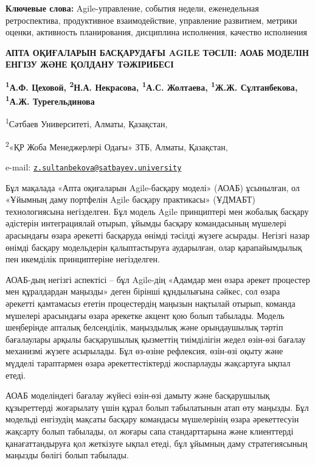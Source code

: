 {\bfseries Ключевые слова:} Agile-управление, события недели, еженедельная
ретроспектива, продуктивное взаимодействие, управление развитием,
метрики оценки, активность планирования, дисциплина исполнения, качество
исполнения

\begin{articleheader}

{\bfseries АПТА ОҚИҒАЛАРЫН БАСҚАРУДАҒЫ AGILE ТӘСІЛІ: АОАБ МОДЕЛІН ЕНГІЗУ
ЖӘНЕ ҚОЛДАНУ ТӘЖІРИБЕСІ}

{\bfseries \textsuperscript{1}А.Ф. Цеховой, \textsuperscript{2}Н.А.
Некрасова, \textsuperscript{1}А.С. Жолтаева, \textsuperscript{1}Ж.Ж.
Сұлтанбекова\textsuperscript{\envelope }, \textsuperscript{1}А.Ж. Турегельдинова}
\end{articleheader}
\begin{affiliation}

\textsuperscript{1}Сәтбаев Университеті, Алматы, Қазақстан,

\textsuperscript{2}«ҚР Жоба Менеджерлері Одағы» ЗТБ, Алматы, Қазақстан,

e-mail:
\href{mailto:z.sultanbekova@satbayev.university}{\nolinkurl{z.sultanbekova@satbayev.university}}
\end{affiliation}

Бұл мақалада «Апта оқиғаларын Agile-басқару моделі» (АОАБ) ұсынылған, ол
«Ұйымның даму портфелін Agile басқару практикасы» (ҰДМАБТ)
технологиясына негізделген. Бұл модель Agile принциптері мен жобалық
басқару әдістерін интеграциялай отырып, ұйымды басқару командасының
мүшелері арасындағы өзара әрекетті басқаруда өнімді тәсілді жүзеге
асырады. Негізгі назар өнімді басқару модельдерін қалыптастыруға
аударылған, олар қарапайымдылық пен икемділік принциптеріне негізделген.

АОАБ-дың негізгі аспектісі -- бұл Agile-дің «Адамдар мен өзара әрекет
процестер мен құралдардан маңызды» деген бірінші құндылығына сәйкес, сол
өзара әрекетті қамтамасыз ететін процестердің маңызын нақтылай отырып,
команда мүшелері арасындағы өзара әрекетке акцент қою болып табылады.
Модель шеңберінде апталық белсенділік, маңыздылық және орындаушылық
тәртіп бағалаулары арқылы басқарушылық қызметтің тиімділігін жедел
өзін-өзі бағалау механизмі жүзеге асырылады. Бұл өз-өзіне рефлексия,
өзін-өзі оқыту және мүдделі тараптармен өзара әрекеттестіктерді
жоспарлауды жақсартуға ықпал етеді.

АОАБ моделіндегі бағалау жүйесі өзін-өзі дамыту және басқарушылық
құзыреттерді жоғарылату үшін құрал болып табылатынын атап өту маңызды.
Бұл модельді енгізудің мақсаты басқару командасы мүшелерінің өзара
әрекеттесуін жақсарту болып табылады, ол жоғары сапа стандарттарына және
клиенттерді қанағаттандыруға қол жеткізуге ықпал етеді, бұл ұйымның даму
стратегиясының маңызды бөлігі болып табылады.

